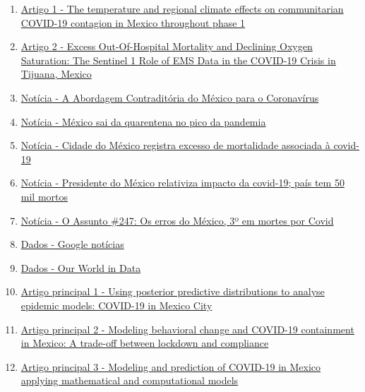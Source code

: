 \documentclass{article}
\begin{document}
\begin{enumerate}
    \item \href{https://www.sciencedirect.com/science/article/pii/S0048969720330771}{Artigo 1 - The temperature and regional climate effects on communitarian COVID-19 contagion in Mexico throughout phase 1}
    \item \href{https://www.sciencedirect.com/science/article/pii/S0196064420306016}{Artigo 2 - Excess Out-Of-Hospital Mortality and Declining Oxygen Saturation: The Sentinel 1 Role of EMS Data in the COVID-19 Crisis in Tijuana, Mexico}
    \item \href{https://www.nexojornal.com.br/expresso/2020/03/26/A-abordagem-contradit\%C3\%B3ria-do-M\%C3\%A9xico-para-o-coronav\%C3\%ADrus}{Notícia - A Abordagem Contraditória do México para o Coronavírus}
    \item \href{https://g1.globo.com/mundo/blog/sandra-cohen/post/2020/06/05/mexico-sai-da-quarentena-no-pico-da-pandemia.ghtml}{Notícia - México sai da quarentena no pico da pandemia}
    \item \href{https://noticias.uol.com.br/ultimas-noticias/afp/2020/09/17/cidade-do-mexico-registra-excesso-de-mortalidade-associada-a-covid-19.htm}{Notícia - Cidade do México registra excesso de mortalidade associada à covid-19}
    \item \href{https://noticias.uol.com.br/ultimas-noticias/afp/2020/08/07/lopez-obrador-relativiza-impacto-da-covid-19-no-mexico.htm}{Notícia - Presidente do México relativiza impacto da covid-19; país tem 50 mil mortos}
    \item \href{https://g1.globo.com/podcast/o-assunto/noticia/2020/08/06/o-assunto-247-os-erros-do-mexico-3o-em-mortes-por-covid.ghtml}{Notícia - O Assunto \#247: Os erros do México, 3º em mortes por Covid}
    \item \href{https://news.google.com/covid19/map?hl=pt-PT&mid=\%2Fm\%2F0b90_r&gl=PT&ceid=PT\%3Apt-150}{Dados - Google notícias}
    \item \href{https://ourworldindata.org/coronavirus}{Dados - Our World in Data}
    \item \href{https://iopscience.iop.org/article/10.1088/1478-3975/abb115}{Artigo principal 1 - Using posterior predictive distributions to analyse epidemic models: COVID-19 in Mexico City}
    \item \href{https://www.sciencedirect.com/science/article/pii/S0025556420300596}{Artigo principal 2 - Modeling behavioral change and COVID-19 containment in Mexico: A trade-off between lockdown and compliance}
    \item \href{https://www.sciencedirect.com/science/article/pii/S0960077920303453}{Artigo principal 3 - Modeling and prediction of COVID-19 in Mexico applying mathematical and computational models}
\end{enumerate}
\end{document}
